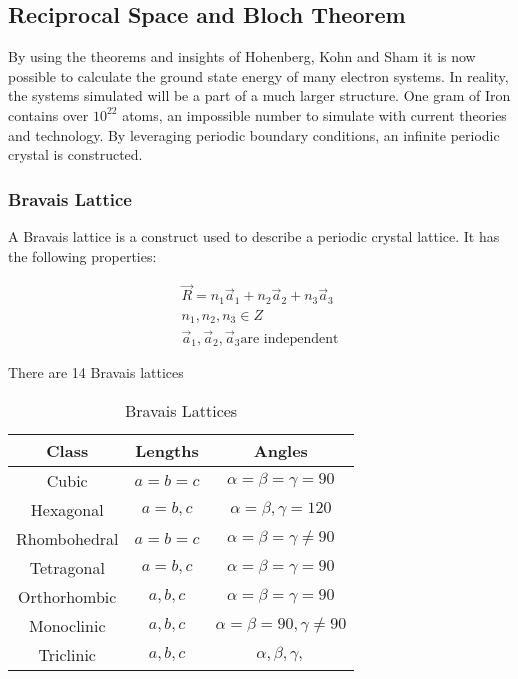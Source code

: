  

\subsection{Reciprocal Space and Bloch Theorem}

By using the theorems and insights of Hohenberg, Kohn and Sham it is now possible to calculate the ground state energy of many electron systems.  In reality, the systems simulated will be a part of a much larger structure.  One gram of Iron contains over $10^22$ atoms, an impossible number to simulate with current theories and technology.  By leveraging periodic boundary conditions, an infinite periodic crystal is constructed.



\subsubsection{Bravais Lattice}

A Bravais lattice is a construct used to describe a periodic crystal lattice.  It has the following properties: 

\begin{equation}
  \begin{split}
    \vec{R} = n_1 \vec{a}_1 + n_2 \vec{a}_2 + n_3 \vec{a}_3 \\
    n_1 , n_2, n_3 \in Z \\
    \vec{a}_1, \vec{a}_2, \vec{a}_3 \text{are independent}
  \end{split}
  \label{eq:eqEulersFormula}
\end{equation}

There are 14 Bravais lattices


\begin{table}[h]
\caption{Bravais Lattices}
\begin{center}
\begin{tabular}{c c c}
Class & Lengths & Angles \\
\hline\hline
Cubic & $a = b = c$ & $ \alpha = \beta = \gamma = 90 $ \\
Hexagonal & $a = b, c $ & $ \alpha = \beta, \gamma = 120 $ \\
Rhombohedral & $a = b = c $ & $ \alpha = \beta = \gamma \neq 90 $ \\
Tetragonal & $a = b, c $ & $ \alpha = \beta = \gamma = 90 $ \\
Orthorhombic & $a, b, c $ & $ \alpha = \beta = \gamma = 90 $ \\
Monoclinic & $a, b, c $ & $ \alpha = \beta = 90, \gamma \neq 90 $ \\
Triclinic & $a, b, c $ & $ \alpha, \beta, \gamma, $ \\
\end{tabular}
\end{center}
\end{table}




